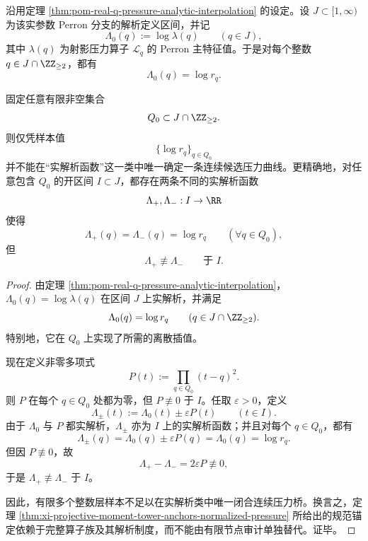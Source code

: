 \begin{theorem}\label{thm:xi-time-part9xg-finite-integer-moment-samples-do-not-determine-analytic-bridge}
沿用定理 \ref{thm:pom-real-q-pressure-analytic-interpolation} 的设定。设 \(J\subset [1,\infty)\) 为该实参数 Perron 分支的解析定义区间，并记
\[
\Lambda_0(q):=\log \lambda(q)
\qquad (q\in J),
\]
其中 \(\lambda(q)\) 为射影压力算子 \(\mathcal L_q\) 的 Perron 主特征值。于是对每个整数 \(q\in J\cap \ZZ_{\ge 2}\)，都有
\[
\Lambda_0(q)=\log r_q.
\]

固定任意有限非空集合
\[
Q_0\subset J\cap \ZZ_{\ge 2}.
\]
则仅凭样本值
\[
\{\log r_q\}_{q\in Q_0}
\]
并不能在“实解析函数”这一类中唯一确定一条连续候选压力曲线。更精确地，对任意包含 \(Q_0\) 的开区间 \(I\subset J\)，都存在两条不同的实解析函数
\[
\Lambda_+,\Lambda_-:I\to\RR
\]
使得
\[
\Lambda_+(q)=\Lambda_-(q)=\log r_q
\qquad (\forall q\in Q_0),
\]
但
\[
\Lambda_+\not\equiv \Lambda_-
\qquad\text{于 }I.
\]
\end{theorem}
\begin{proof}
由定理 \ref{thm:pom-real-q-pressure-analytic-interpolation}，\(\Lambda_0(q)=\log\lambda(q)\) 在区间 \(J\) 上实解析，并满足
\[
\Lambda_0(q)=\log r_q
\qquad
(q\in J\cap \ZZ_{\ge 2}).
\]
特别地，它在 \(Q_0\) 上实现了所需的离散插值。

现在定义非零多项式
\[
P(t):=\prod_{q\in Q_0}(t-q)^2.
\]
则 \(P\) 在每个 \(q\in Q_0\) 处都为零，但 \(P\not\equiv 0\) 于 \(I\)。任取 \(\varepsilon>0\)，定义
\[
\Lambda_\pm(t):=\Lambda_0(t)\pm \varepsilon P(t)
\qquad (t\in I).
\]
由于 \(\Lambda_0\) 与 \(P\) 都实解析，\(\Lambda_\pm\) 亦为 \(I\) 上的实解析函数；并且对每个 \(q\in Q_0\)，都有
\[
\Lambda_\pm(q)=\Lambda_0(q)\pm \varepsilon P(q)=\Lambda_0(q)=\log r_q.
\]
但因 \(P\not\equiv 0\)，故
\[
\Lambda_+-\Lambda_-=2\varepsilon P\not\equiv 0,
\]
于是 \(\Lambda_+\not\equiv \Lambda_-\) 于 \(I\)。

因此，有限多个整数层样本不足以在实解析类中唯一闭合连续压力桥。换言之，定理 \ref{thm:xi-projective-moment-tower-anchors-normalized-pressure} 所给出的规范锚定依赖于完整算子族及其解析制度，而不能由有限节点审计单独替代。证毕。
\end{proof}

